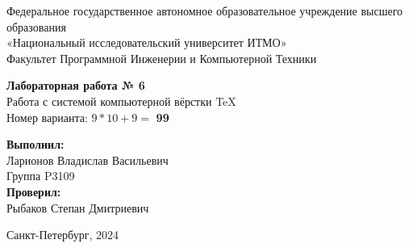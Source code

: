 \thispagestyle{empty}

\vspace*{2em}

\begin{center}
    Федеральное государственное автономное образовательное учреждение высшего образования \\[0.5em]
    «Национальный исследовательский университет ИТМО» \\

    \vspace{3em}
    Факультет Программной Инженерии и Компьютерной Техники \\
\end{center}

\vfill
\begin{center}
    {\Large \textbf{Лабораторная работа № 6}} \\[1em]
    {Работа с системой компьютерной вёрстки \TeX} \\[1em]
    Номер варианта: $9*10 + 9 =$ \textbf{99} \\
\end{center}

\vfill
\begin{flushright}
    \textbf{Выполнил:} \\[0.5em]
    Ларионов Владислав Васильевич \\[0.5em]
    Группа P3109 \\[2em]
    \textbf{Проверил:} \\[0.5em]
    Рыбаков Степан Дмитриевич \\
\end{flushright}

\vfill
\begin{center}
Санкт-Петербург, 2024
\end{center}
\vspace{3em}
